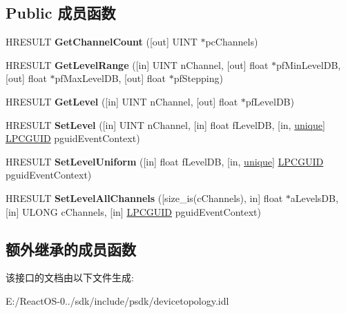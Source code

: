 \subsection*{Public 成员函数}
\begin{DoxyCompactItemize}
\item 
\mbox{\label{interface_i_per_channel_db_level_ab5abbee8dfb450ffd0edf31cbc1482a2}} 
H\+R\+E\+S\+U\+LT {\bfseries Get\+Channel\+Count} (\mbox{[}out\mbox{]} U\+I\+NT $\ast$pc\+Channels)
\item 
\mbox{\label{interface_i_per_channel_db_level_a5e3a2d9b0d0725cf4b31cb5276b2bae2}} 
H\+R\+E\+S\+U\+LT {\bfseries Get\+Level\+Range} (\mbox{[}in\mbox{]} U\+I\+NT n\+Channel, \mbox{[}out\mbox{]} float $\ast$pf\+Min\+Level\+DB, \mbox{[}out\mbox{]} float $\ast$pf\+Max\+Level\+DB, \mbox{[}out\mbox{]} float $\ast$pf\+Stepping)
\item 
\mbox{\label{interface_i_per_channel_db_level_a7e8d394f8c72e34c8d676a167bc67e1e}} 
H\+R\+E\+S\+U\+LT {\bfseries Get\+Level} (\mbox{[}in\mbox{]} U\+I\+NT n\+Channel, \mbox{[}out\mbox{]} float $\ast$pf\+Level\+DB)
\item 
\mbox{\label{interface_i_per_channel_db_level_aeaaee15a20fc44504de4113a6261a39f}} 
H\+R\+E\+S\+U\+LT {\bfseries Set\+Level} (\mbox{[}in\mbox{]} U\+I\+NT n\+Channel, \mbox{[}in\mbox{]} float f\+Level\+DB, \mbox{[}in, \hyperlink{interfaceunique}{unique}\mbox{]} \hyperlink{interface_g_u_i_d}{L\+P\+C\+G\+U\+ID} pguid\+Event\+Context)
\item 
\mbox{\label{interface_i_per_channel_db_level_a8cb6d9fe5e60be254592d364d9edaf9a}} 
H\+R\+E\+S\+U\+LT {\bfseries Set\+Level\+Uniform} (\mbox{[}in\mbox{]} float f\+Level\+DB, \mbox{[}in, \hyperlink{interfaceunique}{unique}\mbox{]} \hyperlink{interface_g_u_i_d}{L\+P\+C\+G\+U\+ID} pguid\+Event\+Context)
\item 
\mbox{\label{interface_i_per_channel_db_level_adff1e8c0e803cc36f8e4b8062d5eeb03}} 
H\+R\+E\+S\+U\+LT {\bfseries Set\+Level\+All\+Channels} (\mbox{[}size\+\_\+is(c\+Channels), in\mbox{]} float $\ast$a\+Levels\+DB, \mbox{[}in\mbox{]} U\+L\+O\+NG c\+Channels, \mbox{[}in\mbox{]} \hyperlink{interface_g_u_i_d}{L\+P\+C\+G\+U\+ID} pguid\+Event\+Context)
\end{DoxyCompactItemize}
\subsection*{额外继承的成员函数}


该接口的文档由以下文件生成\+:\begin{DoxyCompactItemize}
\item 
E\+:/\+React\+O\+S-\/0../sdk/include/psdk/devicetopology.\+idl\end{DoxyCompactItemize}
